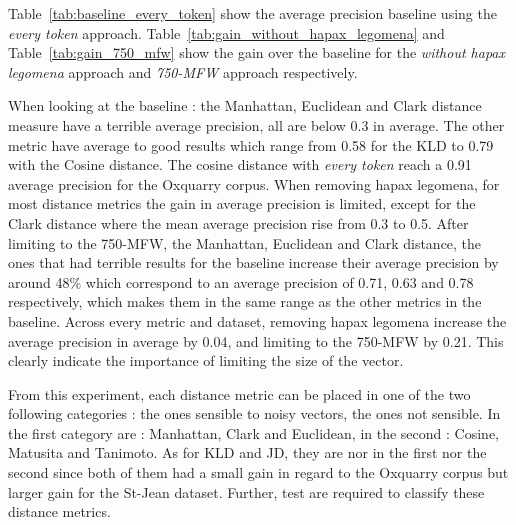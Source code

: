 Table~\ref{tab:baseline_every_token} show the average precision baseline using the \textit{every token} approach.
Table~\ref{tab:gain_without_hapax_legomena} and Table~\ref{tab:gain_750_mfw} show the gain over the baseline for the \textit{without hapax legomena} approach and \textit{750-MFW} approach respectively.

When looking at the baseline : the Manhattan, Euclidean and Clark distance measure have a terrible average precision, all are below 0.3 in average.
The other metric have average to good results which range from 0.58 for the KLD to 0.79 with the Cosine distance.
The cosine distance with \textit{every token} reach a 0.91 average precision for the Oxquarry corpus.
When removing hapax legomena, for most distance metrics the gain in average precision is limited, except for the Clark distance where the mean average precision rise from 0.3 to 0.5.
After limiting to the 750-MFW, the Manhattan, Euclidean and Clark distance, the ones that had terrible results for the baseline increase their average precision by around 48\% which correspond to an average precision of 0.71, 0.63 and 0.78 respectively, which makes them in the same range as the other metrics in the baseline.
Across every metric and dataset, removing hapax legomena increase the average precision in average by 0.04, and limiting to the 750-MFW by 0.21.
This clearly indicate the importance of limiting the size of the vector.

From this experiment, each distance metric can be placed in one of the two following categories : the ones sensible to noisy vectors, the ones not sensible.
In the first category are : Manhattan, Clark and Euclidean, in the second : Cosine, Matusita and Tanimoto.
As for KLD and JD, they are nor in the first nor the second since both of them had a small gain in regard to the Oxquarry corpus but larger gain for the St-Jean dataset.
Further, test are required to classify these distance metrics.

